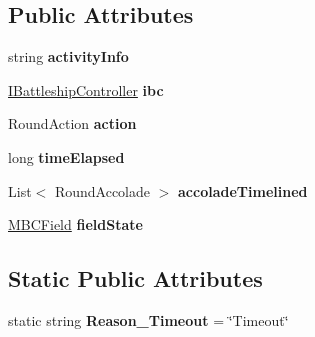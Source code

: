\subsection*{Public Attributes}
\begin{DoxyCompactItemize}
\item 
\hypertarget{class_m_b_c_core_1_1_m_b_c_round_log_1_1_round_activity_a4b035d1d53cb2da6c98d6a00efa9d76c}{string {\bfseries activity\-Info}}\label{class_m_b_c_core_1_1_m_b_c_round_log_1_1_round_activity_a4b035d1d53cb2da6c98d6a00efa9d76c}

\item 
\hypertarget{class_m_b_c_core_1_1_m_b_c_round_log_1_1_round_activity_ad9c13b911109f13dee4c5c949a49afa9}{\hyperlink{interface_m_b_c_core_1_1_i_battleship_controller}{I\-Battleship\-Controller} {\bfseries ibc}}\label{class_m_b_c_core_1_1_m_b_c_round_log_1_1_round_activity_ad9c13b911109f13dee4c5c949a49afa9}

\item 
\hypertarget{class_m_b_c_core_1_1_m_b_c_round_log_1_1_round_activity_a50f40e10554e46fc60efccc31d82fcec}{Round\-Action {\bfseries action}}\label{class_m_b_c_core_1_1_m_b_c_round_log_1_1_round_activity_a50f40e10554e46fc60efccc31d82fcec}

\item 
\hypertarget{class_m_b_c_core_1_1_m_b_c_round_log_1_1_round_activity_a359558e812324ff45760136a1877acc2}{long {\bfseries time\-Elapsed}}\label{class_m_b_c_core_1_1_m_b_c_round_log_1_1_round_activity_a359558e812324ff45760136a1877acc2}

\item 
\hypertarget{class_m_b_c_core_1_1_m_b_c_round_log_1_1_round_activity_a78facb43d58c3f792e30c314138cfd2c}{List$<$ Round\-Accolade $>$ {\bfseries accolade\-Timelined}}\label{class_m_b_c_core_1_1_m_b_c_round_log_1_1_round_activity_a78facb43d58c3f792e30c314138cfd2c}

\item 
\hypertarget{class_m_b_c_core_1_1_m_b_c_round_log_1_1_round_activity_ae705e0712bdc18def0f8ef85708e77f2}{\hyperlink{class_m_b_c_core_1_1_m_b_c_field}{M\-B\-C\-Field} {\bfseries field\-State}}\label{class_m_b_c_core_1_1_m_b_c_round_log_1_1_round_activity_ae705e0712bdc18def0f8ef85708e77f2}

\end{DoxyCompactItemize}
\subsection*{Static Public Attributes}
\begin{DoxyCompactItemize}
\item 
\hypertarget{class_m_b_c_core_1_1_m_b_c_round_log_1_1_round_activity_a50776c45321a1f9a7c15c7321dbbc674}{static string {\bfseries Reason\-\_\-\-Timeout} = \char`\"{}Timeout\char`\"{}}\label{class_m_b_c_core_1_1_m_b_c_round_log_1_1_round_activity_a50776c45321a1f9a7c15c7321dbbc674}

\end{DoxyCompactItemize}


